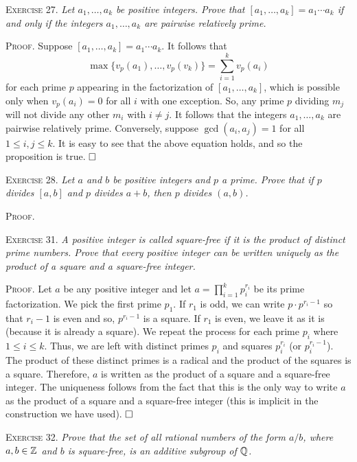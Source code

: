 \documentclass[11pt, leqno]{article}
\newcommand{\done}{\ensuremath{\hfill\square}}
\begin{document}
\textsc{Exercise 27}. \emph{Let $a_1, \ldots, a_k$ be positive integers. Prove that $[a_1, \ldots, a_k] = a_1\cdots a_k$ if and only if the integers $a_1, \ldots, a_k$ are pairwise relatively prime.}

\textsc{Proof}. Suppose $[a_1, \ldots, a_k] = a_1\cdots a_k$. It follows that 
\begin{displaymath}
\max\{ v_p(a_1), \ldots, v_p(v_k) \} = \sum_{i=1}^k v_p(a_i)
\end{displaymath}
for each prime $p$ appearing in the factorization of $[a_1, \ldots, a_k]$, which is possible only when $v_p(a_i) = 0$ for all $i$ with one exception. So, any prime $p$ dividing $m_j$ will not divide any other $m_i$ with $i \ne j$. It follows that the integers $a_1, \ldots, a_k$ are pairwise relatively prime. Conversely, suppose $\gcd(a_i, a_j) = 1$ for all $1 \leq i, j \leq k$. It is easy to see that the above equation holds, and so the proposition is true. \done

\textsc{Exercise 28}. \emph{Let $a$ and $b$ be positive integers and $p$ a prime. Prove that if $p$ divides $[a,b]$ and $p$ divides $a+b$, then $p$ divides $(a,b)$.}

\textsc{Proof}.

\textsc{Exercise 31}. \emph{A positive integer is called square-free if it is the product of distinct prime numbers. Prove that every positive integer can be written uniquely as the product of a square and a square-free integer.}

\textsc{Proof}. Let $a$ be any positive integer and let $a = \prod_{i=1}^k p_i^{r_i}$ be its prime factorization. We pick the first prime $p_1$. If $r_1$ is odd, we can write $p\cdot p^{r_i - 1}$ so that $r_i-1$ is even and so, $p^{r_i-1}$ is a square. If $r_1$ is even, we leave it as it is (because it is already a square). We repeat the process for each prime $p_i$ where $1 \leq i \leq k$. Thus, we are left with distinct primes $p_i$ and squares $p_i^{r_i}$ (or $p_i^{r_i-1}$). The product of these distinct primes is a radical and the product of the squares is a square. Therefore, $a$ is written as the product of a square and a square-free integer. The uniqueness follows from the fact that this is the only way to write $a$ as the product of a square and a square-free integer (this is implicit in the construction we have used). \done

\textsc{Exercise 32}. \emph{Prove that the set of all rational numbers of the form $a/b$, where $a, b \in \mathbb{Z}$ and $b$ is square-free, is an additive subgroup of $\mathbb{Q}$.}
\end{document}
